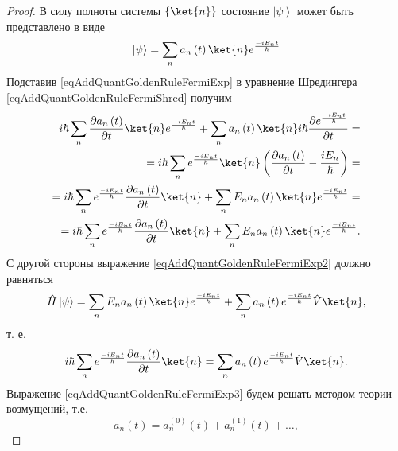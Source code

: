 \begin{proof}
  В силу полноты системы $\left\{\ket{n}\right\}$ состояние
  $\left|\psi\right>$ может быть представлено в виде
  \begin{equation}
    \left|\psi\right> = \sum_n a_n\left(t\right) \ket{n}
    e^{\frac{-i E_n t}{\hbar}}
    \label{eqAddQuantGoldenRuleFermiExp}
  \end{equation}
  Подставив \eqref{eqAddQuantGoldenRuleFermiExp} в уравнение Шредингера
  \eqref{eqAddQuantGoldenRuleFermiShred} получим
  \begin{eqnarray}
    i \hbar \sum_n \frac{ \partial a_n\left(t\right)}{\partial t }
    \ket{n} e^{\frac{-i E_n t}{\hbar}} +
    \sum_n a_n\left(t\right) \ket{n}
    i \hbar \frac{\partial e^{\frac{-i E_n t}{\hbar}}}{ \partial t} =
    \\ \nonumber
    = i \hbar \sum_n  e^{\frac{-i E_n t}{\hbar}} \ket{n} \left(
    \frac{ \partial a_n\left(t\right)}{\partial t } - \frac{i E_n}{\hbar} 
    \right) =
    \\ \nonumber
    =  i \hbar \sum_n  e^{\frac{-i E_n t}{\hbar}}
    \frac{ \partial a_n\left(t\right)}{\partial t } \ket{n}+
    \sum_n E_n a_n\left(t\right) \ket{n}
    e^{\frac{-i E_n t}{\hbar}} =
    \nonumber \\
    =
     i \hbar \sum_n  e^{\frac{-i E_n t}{\hbar}}
     \frac{ \partial a_n\left(t\right)}{\partial t } \ket{n}+
      \sum_n E_n a_n\left(t\right) \ket{n}
    e^{\frac{-i E_n t}{\hbar}}.
    \label{eqAddQuantGoldenRuleFermiExp2}
  \end{eqnarray}
  С другой стороны выражение \eqref{eqAddQuantGoldenRuleFermiExp2}
  должно равняться
  \begin{equation}
    \hat{H} \left|\psi\right> =
    \sum_n E_n a_n\left(t\right) \ket{n}
    e^{\frac{-i E_n t}{\hbar}} +
    \sum_n  a_n\left(t\right) 
    e^{\frac{-i E_n t}{\hbar}} \hat{V} \ket{n},
    \nonumber
  \end{equation}
  т. е.
  \begin{eqnarray}
    i \hbar \sum_n  e^{\frac{-i E_n t}{\hbar}}
    \frac{ \partial a_n\left(t\right)}{\partial t } \ket{n} =
     \sum_n  a_n\left(t\right) 
    e^{\frac{-i E_n t}{\hbar}} \hat{V} \ket{n}.
    \label{eqAddQuantGoldenRuleFermiExp3}
  \end{eqnarray}
  Выражение \eqref{eqAddQuantGoldenRuleFermiExp3} будем решать
  методом теории возмущений, т.е.
  \begin{equation}
    a_n\left(t\right) = a_n^{(0)}\left(t\right) +
    a_n^{(1)}\left(t\right) + \dots,    
    \nonumber
  \end{equation}

\end{proof}
